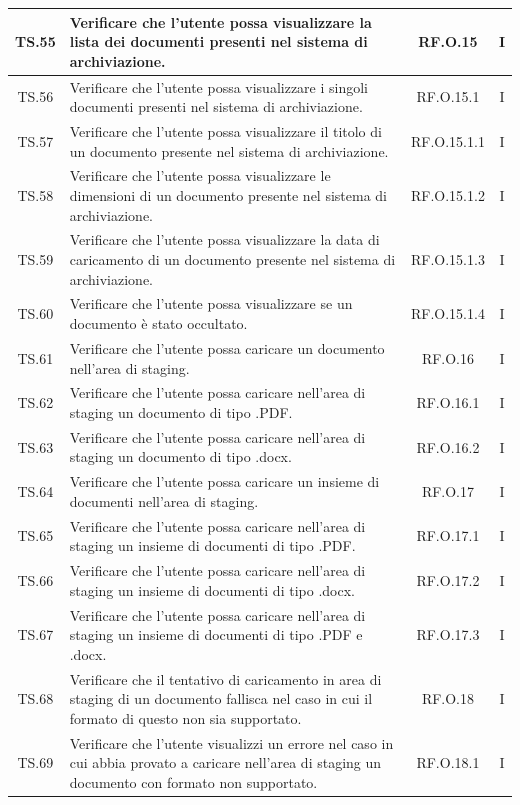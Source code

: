 \begin{xltabular}{\textwidth}{|c|X|c|c|}
\hline
TS.55 & Verificare che l'utente possa visualizzare la lista dei documenti presenti nel sistema di archiviazione. & RF.O.15 & I \\
\hline
TS.56 & Verificare che l'utente possa visualizzare i singoli documenti presenti nel sistema di archiviazione. & RF.O.15.1 & I \\
\hline
TS.57 & Verificare che l'utente possa visualizzare il titolo di un documento presente nel sistema di archiviazione. & RF.O.15.1.1 & I \\
\hline
TS.58 & Verificare che l'utente possa visualizzare le dimensioni di un documento presente nel sistema di archiviazione. & RF.O.15.1.2 & I \\
\hline
TS.59 & Verificare che l'utente possa visualizzare la data di caricamento di un documento presente nel sistema di archiviazione. & RF.O.15.1.3 & I \\
\hline
TS.60 & Verificare che l'utente possa visualizzare se un documento è stato occultato. & RF.O.15.1.4 & I \\
\hline
TS.61 & Verificare che l'utente possa caricare un documento nell’area di staging. & RF.O.16 & I \\
\hline
TS.62 & Verificare che l'utente possa caricare nell’area di staging un documento di tipo .PDF. & RF.O.16.1 & I \\
\hline
TS.63 & Verificare che l'utente possa caricare nell’area di staging un documento di tipo .docx. & RF.O.16.2 & I \\
\hline
TS.64 & Verificare che l'utente possa caricare un insieme di documenti nell’area di staging. & RF.O.17 & I \\
\hline
TS.65 & Verificare che l'utente possa caricare nell’area di staging un insieme di documenti di tipo .PDF. & RF.O.17.1 & I \\
\hline
TS.66 & Verificare che l'utente possa caricare nell’area di staging un insieme di documenti di tipo .docx. & RF.O.17.2 & I \\
\hline
TS.67 & Verificare che l'utente possa caricare nell’area di staging un insieme di documenti di tipo .PDF e .docx. & RF.O.17.3 & I \\
\hline
TS.68 & Verificare che il tentativo di caricamento in area di staging di un documento fallisca nel caso in cui il formato di questo non sia supportato. & RF.O.18 & I \\
\hline
TS.69 & Verificare che l'utente visualizzi un errore nel caso in cui abbia provato a caricare nell’area di staging un documento con formato non supportato. & RF.O.18.1 & I \\

\end{xltabular}
